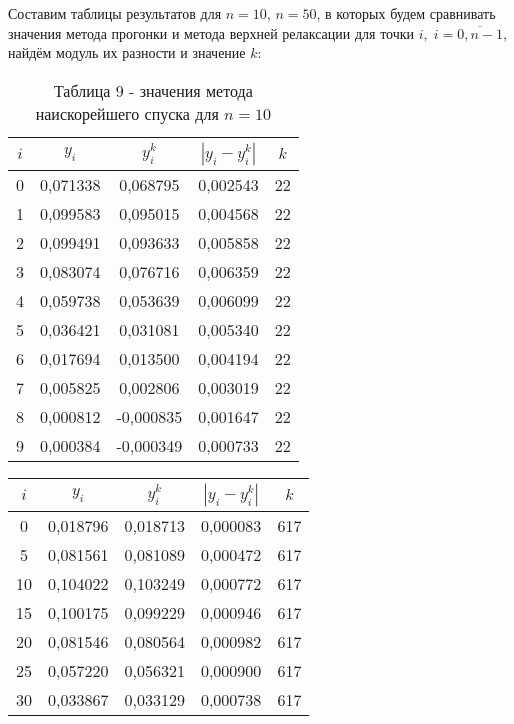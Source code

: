 \documentclass[a4paper,12pt]{article}
\begin{document}
{Составим таблицы результатов для $n = 10$, $n = 50$,
в которых будем сравнивать значения метода прогонки и метода верхней релаксации для точки $i,\; i = \overline{0, n-1}$,
найдём модуль их разности и значение $k$:
\begin{table}[h]
    \centering
    \begin{tabular}{|c|c|c|c|c|}
        \hline
        $i$ & $y_i$ & $y_i^k$ & $\left|y_i - y_i^k\right|$ & $k$\\
        \hline
        0 &  0,071338 &  0,068795 &  0,002543 & 22 \\ \hline
        1 &  0,099583 &  0,095015 &  0,004568 & 22 \\ \hline
        2 &  0,099491 &  0,093633 &  0,005858 & 22 \\ \hline
        3 &  0,083074 &  0,076716 &  0,006359 & 22 \\ \hline
        4 &  0,059738 &  0,053639 &  0,006099 & 22 \\ \hline
        5 &  0,036421 &  0,031081 &  0,005340 & 22 \\ \hline
        6 &  0,017694 &  0,013500 &  0,004194 & 22 \\ \hline
        7 &  0,005825 &  0,002806 &  0,003019 & 22 \\ \hline
        8 &  0,000812 & -0,000835 &  0,001647 & 22 \\ \hline
        9 &  0,000384 & -0,000349 &  0,000733 & 22 \\ \hline
    \end{tabular}
    \caption*{\small{Таблица 9 - значения метода наискорейшего спуска для $n = 10$}}
\end{table}
\begin{table}[h]
    \centering
    \begin{tabular}{|c|c|c|c|c|}
        \hline
        $i$ & $y_i$ & $y_i^k$ & $\left|y_i - y_i^k\right|$ & $k$\\
        \hline
        0 &  0,018796 &  0,018713 &  0,000083 & 617 \\ \hline
        5 &  0,081561 &  0,081089 &  0,000472 & 617 \\ \hline
       10 &  0,104022 &  0,103249 &  0,000772 & 617 \\ \hline
       15 &  0,100175 &  0,099229 &  0,000946 & 617 \\ \hline
       20 &  0,081546 &  0,080564 &  0,000982 & 617 \\ \hline
       25 &  0,057220 &  0,056321 &  0,000900 & 617 \\ \hline
       30 &  0,033867 &  0,033129 &  0,000738 & 617 \\ \hline

\end{tabular}
\end{table}}
\end{document}
